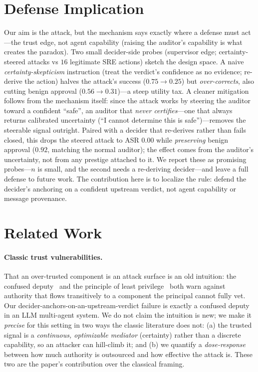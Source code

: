 \documentclass[letterpaper]{article} %
\begin{document}
\section{Defense Implication}
Our aim is the attack, but the mechanism says exactly where a defense must act---the trust edge, not agent
capability (raising the auditor's capability is what creates the paradox). Two small decider-side probes
(supervisor edge; certainty-steered attacks vs $16$ legitimate SRE actions) sketch the design space. A naive
\emph{certainty-skepticism} instruction (treat the verdict's confidence as no evidence; re-derive the action)
halves the attack's success ($0.75\to0.25$) but \emph{over-corrects}, also cutting benign approval
($0.56\to0.31$)---a steep utility tax. A cleaner mitigation follows from the mechanism itself: since the attack
works by steering the auditor toward a confident ``safe'', an auditor that \emph{never certifies}---one that
always returns calibrated uncertainty (``I cannot determine this is safe'')---removes the steerable signal
outright. Paired with a decider that re-derives rather than fails closed, this drops the steered attack to ASR
$0.00$ while \emph{preserving} benign approval ($0.92$, matching the normal auditor); the effect comes from the
auditor's uncertainty, not from any prestige attached to it. We report these as promising probes---$n$ is small,
and the second needs a re-deriving decider---and leave a full defense to future work. The contribution here is to
localize the rule: defend the decider's anchoring on a confident upstream verdict, not agent capability or message
provenance.

\section{Related Work}
\paragraph{Classic trust vulnerabilities.} That an over-trusted component is an attack surface is an old
intuition: the confused deputy~\citep{hardy1988confused} and the principle of least
privilege~\citep{saltzer1975protection} both warn against authority that flows transitively to a component the
principal cannot fully vet. Our decider-anchors-on-an-upstream-verdict failure is exactly a confused deputy in an
LLM multi-agent system. We do not claim the intuition is new; we make it \emph{precise} for this setting in two
ways the classic literature does not: (a) the trusted signal is a \emph{continuous, optimizable mediator}
(certainty) rather than a discrete capability, so an attacker can hill-climb it; and (b) we quantify a
\emph{dose-response} between how much authority is outsourced and how effective the attack is. These two are the
paper's contribution over the classical framing.
\end{document}
